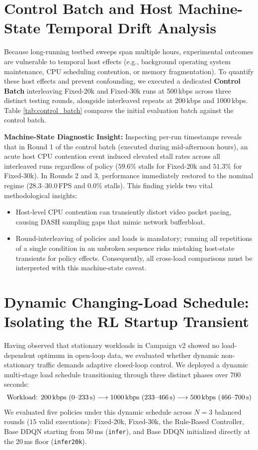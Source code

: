 \documentclass[12pt,a4paper,oneside]{report}
\begin{document}
\section{Control Batch and Host Machine-State Temporal Drift Analysis}
\label{sec:control_batch}
Because long-running testbed sweeps span multiple hours, experimental outcomes are vulnerable to temporal host effects (e.g., background operating system maintenance, CPU scheduling contention, or memory fragmentation). To quantify these host effects and prevent confounding, we executed a dedicated \textbf{Control Batch} interleaving Fixed-20k and Fixed-30k runs at 500\,kbps across three distinct testing rounds, alongside interleaved repeats at 200\,kbps and 1000\,kbps. Table \ref{tab:control_batch} compares the initial evaluation batch against the control batch.



\textbf{Machine-State Diagnostic Insight:}
Inspecting per-run timestamps reveals that in Round 1 of the control batch (executed during mid-afternoon hours), an acute host CPU contention event induced elevated stall rates across all interleaved runs regardless of policy ($59.6\%$ stalls for Fixed-20k and $51.3\%$ for Fixed-30k). In Rounds 2 and 3, performance immediately restored to the nominal regime ($28.3$--$30.0$\,FPS and $0.0\%$ stalls). This finding yields two vital methodological insights:
\begin{itemize}
  \item Host-level CPU contention can transiently distort video packet pacing, causing DASH sampling gaps that mimic network bufferbloat.
  \item Round-interleaving of policies and loads is mandatory; running all repetitions of a single condition in an unbroken sequence risks mistaking host-state transients for policy effects. Consequently, all cross-load comparisons must be interpreted with this machine-state caveat.
\end{itemize}


\section{Dynamic Changing-Load Schedule: Isolating the RL Startup Transient}
\label{sec:dynamic_schedule}
Having observed that stationary workloads in Campaign v2 showed no load-dependent optimum in open-loop data, we evaluated whether dynamic non-stationary traffic demands adaptive closed-loop control. We deployed a dynamic multi-stage load schedule transitioning through three distinct phases over 700\,seconds:
\begin{equation}
  \text{Workload: } 200\,\text{kbps (0--233\,s)} \longrightarrow 1000\,\text{kbps (233--466\,s)} \longrightarrow 500\,\text{kbps (466--700\,s)}
\end{equation}
We evaluated five policies under this dynamic schedule across $N=3$ balanced rounds ($15$ valid executions): Fixed-20k, Fixed-30k, the Rule-Based Controller, Base DDQN starting from 50\,ms (\texttt{infer}), and Base DDQN initialized directly at the 20\,ms floor (\texttt{infer20k}).
\end{document}
